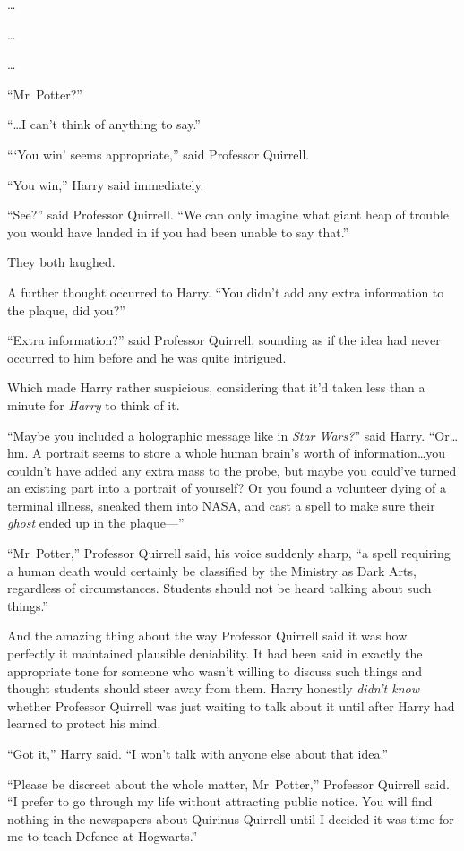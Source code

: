 …

…

…

“Mr~Potter?”

“…I can’t think of anything to say.”

“{}‘You win’ seems appropriate,” said Professor Quirrell.

“You win,” Harry said immediately.

“See?” said Professor Quirrell. “We can only imagine what giant heap of trouble you would have landed in if you had been unable to say that.”

They both laughed.

A further thought occurred to Harry. “You didn’t add any extra information to the plaque, did you?”

“Extra information?” said Professor Quirrell, sounding as if the idea had never occurred to him before and he was quite intrigued.

Which made Harry rather suspicious, considering that it’d taken less than a minute for \emph{Harry} to think of it.

“Maybe you included a holographic message like in \emph{Star Wars?}” said Harry. “Or…hm. A portrait seems to store a whole human brain’s worth of information…you couldn’t have added any extra mass to the probe, but maybe you could’ve turned an existing part into a portrait of yourself? Or you found a volunteer dying of a terminal illness, sneaked them into NASA, and cast a spell to make sure their \emph{ghost} ended up in the plaque—”

“Mr~Potter,” Professor Quirrell said, his voice suddenly sharp, “a spell requiring a human death would certainly be classified by the Ministry as Dark Arts, regardless of circumstances. Students should not be heard talking about such things.”

And the amazing thing about the way Professor Quirrell said it was how perfectly it maintained plausible deniability. It had been said in exactly the appropriate tone for someone who wasn’t willing to discuss such things and thought students should steer away from them. Harry honestly \emph{didn’t know} whether Professor Quirrell was just waiting to talk about it until after Harry had learned to protect his mind.

“Got it,” Harry said. “I won’t talk with anyone else about that idea.”

“Please be discreet about the whole matter, Mr~Potter,” Professor Quirrell said. “I prefer to go through my life without attracting public notice. You will find nothing in the newspapers about Quirinus Quirrell until I decided it was time for me to teach Defence at Hogwarts.”

